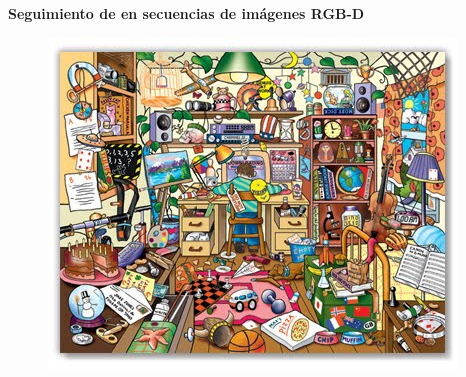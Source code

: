 \documentclass[]{beamer}
\begin{document}
\begin{frame}{}
    \textbf{Seguimiento de  en secuencias de imágenes RGB-D}
    \begin{figure}[t]
        \centering
        \includegraphics[scale=0.6]{img/escena_con_objetos.jpg}
    \end{figure}
\end{frame}
\end{document}
